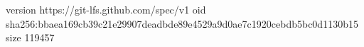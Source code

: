 version https://git-lfs.github.com/spec/v1
oid sha256:bbaea169cb39c21e29907deadbde89e4529a9d0ae7c1920cebdb5bc0d1130b15
size 119457
